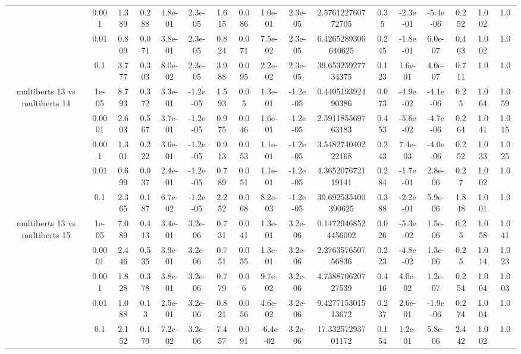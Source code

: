 \begin{tabular}{|c|c|c|c|c|c|c|c|c|c|c|c|c|c|c|c|c|}
 & 0.001 & 1.389 & 0.288 & 4.8e-01 & 2.3e-05 & 1.615 & 0.086 & 1.0e-01 & 2.3e-05 & 2.576122760772705 & 0.35 & -2.3e-01 & -5.4e-06 & 0.252 & 1.002 & 1.0 \\
 & 0.01 & 0.809 & 0.071 & 3.8e-01 & 2.3e-05 & 0.824 & 0.071 & 7.5e-02 & 2.3e-05 & 6.4265289306640625 & 0.245 & -1.8e-01 & 6.0e-07 & 0.463 & 1.002 & 1.0 \\
 & 0.1 & 3.777 & 0.303 & 8.0e-02 & 2.3e-05 & 3.988 & 0.095 & 2.2e-02 & 2.3e-05 & 39.65325927734375 & 0.123 & 1.6e-01 & 4.0e-07 & 0.711 & 1.0 & 1.0 \\
\hline
\multirow{5}{*}{multiberts 13 vs multiberts 14} & 1e-05 & 8.793 & 0.372 & 3.3e-01 & -1.2e-05 & 1.593 & 0.05 & 1.3e-01 & -1.2e-05 & 0.440519392490386 & 0.073 & -4.9e-02 & -4.1e-06 & 0.25 & 1.064 & 1.059 \\
 & 0.0001 & 2.603 & 0.567 & 3.7e-01 & -1.2e-05 & 0.975 & 0.046 & 1.6e-01 & -1.2e-05 & 2.591185569763183 & 0.453 & -5.6e-02 & -4.7e-06 & 0.264 & 1.041 & 1.015 \\
 & 0.001 & 1.301 & 0.222 & 3.6e-01 & -1.2e-05 & 0.913 & 0.053 & 1.1e-01 & -1.2e-05 & 3.548274040222168 & 0.243 & 7.4e-03 & -4.0e-06 & 0.252 & 1.033 & 1.025 \\
 & 0.01 & 0.699 & 0.037 & 2.4e-01 & -1.2e-05 & 0.789 & 0.051 & 1.1e-01 & -1.2e-05 & 4.365207672119141 & 0.284 & -1.7e-01 & 2.8e-06 & 0.27 & 1.002 & 1.0 \\
 & 0.1 & 2.365 & 0.187 & 6.7e-02 & -1.2e-05 & 2.252 & 0.068 & 8.2e-03 & -1.2e-05 & 30.692535400390625 & 0.388 & -2.2e-01 & 5.9e-06 & 1.848 & 1.001 & 1.0 \\
\hline
\multirow{5}{*}{multiberts 13 vs multiberts 15} & 1e-05 & 7.089 & 0.413 & 3.4e-01 & 3.2e-06 & 0.731 & 0.041 & 1.3e-01 & 3.2e-06 & 0.14729468524456002 & 0.026 & -5.3e-02 & 1.5e-06 & 0.25 & 1.058 & 1.041 \\
 & 0.0001 & 2.446 & 0.535 & 3.9e-01 & 3.2e-06 & 0.751 & 0.055 & 1.3e-01 & 3.2e-06 & 2.276357650756836 & 0.223 & -4.8e-02 & 1.3e-06 & 0.25 & 1.014 & 1.023 \\
 & 0.001 & 1.828 & 0.378 & 3.8e-01 & 3.2e-06 & 0.779 & 0.06 & 9.7e-02 & 3.2e-06 & 4.738870620727539 & 0.416 & 4.0e-02 & 1.2e-07 & 0.254 & 1.004 & 1.003 \\
 & 0.01 & 1.088 & 0.13 & 2.5e-01 & 3.2e-06 & 0.821 & 0.056 & 4.6e-02 & 3.2e-06 & 9.427715301513672 & 0.237 & 2.6e-01 & -1.9e-06 & 0.274 & 1.004 & 1.0 \\
 & 0.1 & 2.152 & 0.179 & 7.2e-02 & 3.2e-06 & 7.457 & 0.091 & -6.4e-02 & 3.2e-06 & 17.33257293701172 & 0.154 & 1.2e-01 & 5.8e-06 & 2.442 & 1.002 & 1.0 \\

\end{tabular}
